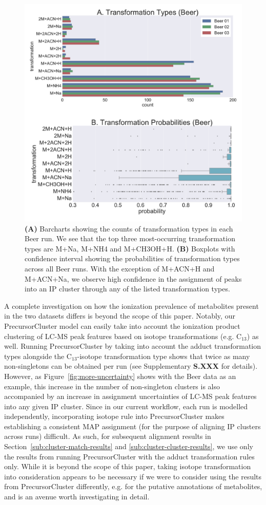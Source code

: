 \begin{figure}[!htbp]
\centering
\includegraphics[width=0.5\linewidth]{05-precursor-cluster/figures/trans_Beer.pdf}
\caption{\label{fig:trans-beer} \textbf{(A)} Barcharts showing the counts of transformation types in each Beer run. We see that the top three most-occurring transformation types are M+Na, M+NH4 and M+CH3OH+H. \textbf{(B)} Boxplots with confidence interval showing the probabilities of transformation types across all Beer runs. With the exception of M+ACN+H and M+ACN+Na, we observe high confidence in the assignment of peaks into an IP cluster through any of the listed transformation types.}
\end{figure}

A complete investigation on how the ionization prevalence of metabolites present in the two datasets differs is beyond the scope of this paper. Notably, our PrecursorCluster model can easily take into account the ionization product clustering of LC-MS peak features based on isotope transformations (e.g. C$_{13}$) as well. Running PrecursorCluster by taking into account the adduct transformation types alongside the C$_{13}$-isotope transformation type shows that twice as many non-singletons can be obtained per run (see Supplementary \textbf{S.XXX} for details). However, as Figure~\ref{fig:more-uncertainty} shows with the Beer data as an example, this increase in the number of non-singleton clusters is also accompanied by an increase in assignment uncertainties of LC-MS peak features into any given IP cluster. Since in our current workflow, each run is modelled independently, incorporating isotope rule into PrecursorCluster makes establishing a consistent MAP assignment (for the purpose of aligning IP clusters across runs) difficult. As such, for subsequent alignment results in Section~\ref{sub:cluster-match-results} and \ref{sub:cluster-cluster-results}, we use only the results from running PrecursorCluster with the adduct transformation rules only. While it is beyond the scope of this paper, taking isotope transformation into consideration appears to be necessary if we were to consider using the results from PrecursorCluster differently, e.g. for the putative annotations of metabolites, and is an avenue worth investigating in detail.

